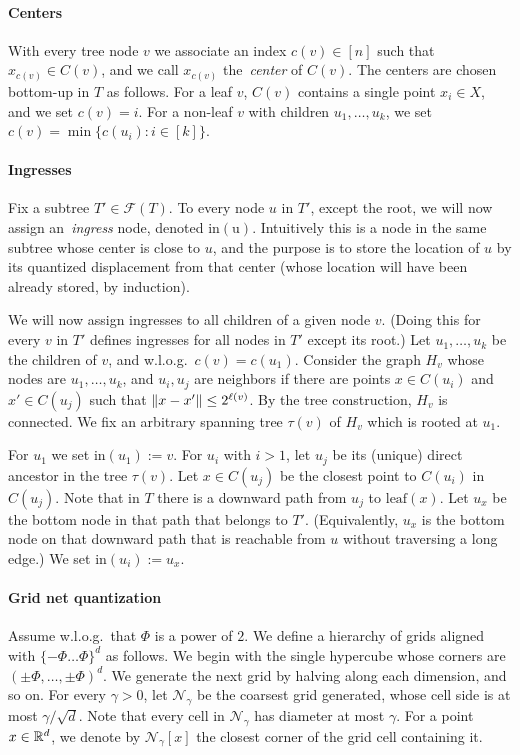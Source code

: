 \paragraph{Centers}
With every tree node $v$ we associate an index $c(v)\in[n]$ such that $x_{c(v)}\in C(v)$, and we call $x_{c(v)}$ the~\emph{center} of $C(v)$.
The centers are chosen bottom-up in $T$ as follows.
For a leaf $v$, $C(v)$ contains a single point $x_i\in X$, and we set $c(v)=i$. 
For a non-leaf $v$ with children $u_1,\ldots,u_k$, we set $c(v)=\min\{c(u_i):i\in[k]\}$.

\paragraph{Ingresses}
Fix a subtree $T'\in\mathcal F(T)$.
To every node $u$ in $T'$, except the root, we will now assign an~\emph{ingress} node, denoted $\mathrm{in(u)}$.
Intuitively this is a node in the same subtree whose center is close to $u$, and the purpose is to store the location of $u$ by its quantized displacement from that center (whose location will have been already stored, by induction).

We will now assign ingresses to all children of a given node $v$. (Doing this for every $v$ in $T'$ defines ingresses for all nodes in $T'$ except its root.) Let $u_1,\ldots,u_k$ be the children of $v$, and w.l.o.g.~$c(v)=c(u_1)$. Consider the graph $H_v$ whose nodes are $u_1,\ldots,u_k$, and $u_i,u_j$ are neighbors if there are points $x\in C(u_i)$ and $x'\in C(u_j)$ such that $\lVert x-x'\rVert\leq2^{\ell(v)}$. By the tree construction, $H_v$ is connected. We fix an arbitrary spanning tree $\tau(v)$ of $H_v$ which is rooted at $u_1$.

For $u_1$ we set $\mathrm{in}(u_1):=v$. For $u_i$ with $i>1$, let $u_j$ be its (unique) direct ancestor in the tree $\tau(v)$. Let $x\in C(u_j)$ be the closest point to $C(u_i)$ in $C(u_j)$. Note that in $T$ there is a downward path from $u_j$ to $\mathrm{leaf}(x)$. Let $u_x$ be the bottom node in that path that belongs to $T'$. (Equivalently, $u_x$ is the bottom node on that downward path that is reachable from $u$ without traversing a long edge.) We set $\mathrm{in}(u_i):=u_x$.

\paragraph{Grid net quantization}
Assume w.l.o.g.~that $\Phi$ is a power of $2$.
We define a hierarchy of grids aligned with $\{-\Phi \ldots \Phi\}^d$ as follows.
We begin with the single hypercube whose corners are $(\pm\Phi, \ldots, \pm\Phi)^d$.
We generate the next grid by halving along each dimension, and so on.
For every $\gamma>0$, let $\mathcal{N}_\gamma$ be the coarsest grid generated, whose cell side is at most $\gamma/\sqrt{d}$. Note that every cell in $\mathcal{N}_\gamma$ has diameter at most $\gamma$.
For a point $x\in\mathbb R^d$, we denote by $\mathcal{N}_\gamma[x]$ the closest corner of the grid cell containing it.

